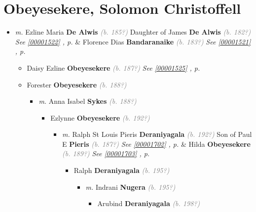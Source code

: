 \documentclass[10pt, openany]{book}
\begin{document}
\chapter{Obeyesekere, Solomon Christoffell}
\label{00001524}
\textcolor{slmaroon}{\textit{}}
\begin{itemize}
\item{\textit{m.} Ezline Maria \textbf{De Alwis} \textcolor{gray}{\textit{(b. 185?)}} Daughter of  James \textbf{De Alwis} \textcolor{gray}{\textit{(b. 182?)}} \textcolor{slteal}{\textit{See  \autoref{00001522} \textit{, p. \pageref{00001522} }}}  \&  Florence Dias \textbf{Bandaranaike} \textcolor{gray}{\textit{(b. 183?)}} \textcolor{slteal}{\textit{See  \autoref{00001521} \textit{, p. \pageref{00001521} }}}   \label{couple:00001523:00001524} \begin{itemize}
\item{Daisy Ezline \textbf{Obeyesekere} \textcolor{gray}{\textit{(b. 187?)}} \textcolor{slteal}{\textit{See  \autoref{00001525} \textit{, p. \pageref{00001525} }}}}
\item{Forester \textbf{Obeyesekere} \textcolor{gray}{\textit{(b. 188?)}}
\begin{itemize}
\item{\textit{m.} Anna Isabel \textbf{Sykes} \textcolor{gray}{\textit{(b. 188?)}}   \label{couple:00001582:00001583} \begin{itemize}
\item{Ezlynne \textbf{Obeyesekere} \textcolor{gray}{\textit{(b. 192?)}}
\begin{itemize}
\item{\textit{m.} Ralph St Louis Pieris \textbf{Deraniyagala} \textcolor{gray}{\textit{(b. 192?)}} Son of  Paul E \textbf{Pieris} \textcolor{gray}{\textit{(b. 187?)}} \textcolor{slteal}{\textit{See  \autoref{00001702} \textit{, p. \pageref{00001702} }}}  \&  Hilda \textbf{Obeyesekere} \textcolor{gray}{\textit{(b. 189?)}} \textcolor{slteal}{\textit{See  \autoref{00001703} \textit{, p. \pageref{00001703} }}}   \label{couple:00001585:00001586} \begin{itemize}
\item{Ralph  \textbf{Deraniyagala} \textcolor{gray}{\textit{(b. 195?)}}
\begin{itemize}
\item{\textit{m.} Indrani \textbf{Nugera} \textcolor{gray}{\textit{(b. 195?)}}   \label{couple:00001587:00001588} \begin{itemize}
\item{Arubind \textbf{Deraniyagala} \textcolor{gray}{\textit{(b. 198?)}}
}
\end{itemize}}
\end{itemize}}
\end{itemize}}
\end{itemize}}
\end{itemize}}
\end{itemize}}
\end{itemize}}
\end{itemize}
\end{document}
